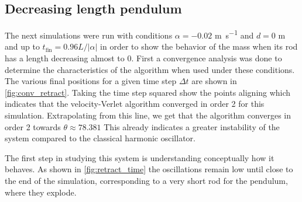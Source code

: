 \subsection{Decreasing length pendulum}
The next simulations were run with conditions $\alpha=-0.02$ \si{\meter\per\second} and $d=0$ \si{\meter} and up to $t_\textrm{fin}=0.96L/|\alpha|$ in order to show the behavior of the mass when its rod has a length decreasing almost to 0. First a convergence analysis was done to determine the characteristics of the algorithm when used under these conditions. The various final positions for a given time step $\Delta t$ are shown in \autoref{fig:conv_retract}. Taking the time step squared show the points aligning which indicates that the velocity-Verlet algorithm converged in order 2 for this simulation. Extrapolating from this line, we get that the algorithm converges in order 2 towards \(\theta \approx 78.381\) This already indicates a greater instability of the system compared to the classical harmonic oscillator.

The first step in studying this system is understanding conceptually how it behaves. As shown in \autoref{fig:retract_time} the oscillations remain low until close to the end of the simulation, corresponding to a very short rod for the pendulum, where they explode.

